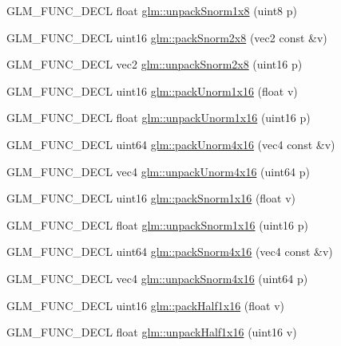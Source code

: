 \begin{DoxyCompactItemize}
\item 
G\+L\+M\+\_\+\+F\+U\+N\+C\+\_\+\+D\+E\+CL float \hyperlink{group__gtc__packing_ga6f2bebf536fbf7c8b97d4b306bb3354e}{glm\+::unpack\+Snorm1x8} (uint8 p)
\item 
G\+L\+M\+\_\+\+F\+U\+N\+C\+\_\+\+D\+E\+CL uint16 \hyperlink{group__gtc__packing_ga05d08a82923166ec7cd5d0e6154c9953}{glm\+::pack\+Snorm2x8} (vec2 const \&v)
\item 
G\+L\+M\+\_\+\+F\+U\+N\+C\+\_\+\+D\+E\+CL vec2 \hyperlink{group__gtc__packing_ga27f30f0281b88e152b0895f5e2ead878}{glm\+::unpack\+Snorm2x8} (uint16 p)
\item 
G\+L\+M\+\_\+\+F\+U\+N\+C\+\_\+\+D\+E\+CL uint16 \hyperlink{group__gtc__packing_ga60c7d915f5653559ae02c2f79a8c5c1d}{glm\+::pack\+Unorm1x16} (float v)
\item 
G\+L\+M\+\_\+\+F\+U\+N\+C\+\_\+\+D\+E\+CL float \hyperlink{group__gtc__packing_ga7770e3ade4f4764cc1b2eb42ac4ec188}{glm\+::unpack\+Unorm1x16} (uint16 p)
\item 
G\+L\+M\+\_\+\+F\+U\+N\+C\+\_\+\+D\+E\+CL uint64 \hyperlink{group__gtc__packing_gac561f06c908b7302537a8ef29fcb409e}{glm\+::pack\+Unorm4x16} (vec4 const \&v)
\item 
G\+L\+M\+\_\+\+F\+U\+N\+C\+\_\+\+D\+E\+CL vec4 \hyperlink{group__gtc__packing_gafb2b502bc406031a5618ce930139a9e3}{glm\+::unpack\+Unorm4x16} (uint64 p)
\item 
G\+L\+M\+\_\+\+F\+U\+N\+C\+\_\+\+D\+E\+CL uint16 \hyperlink{group__gtc__packing_gac29411d6c0f6ed0fe9f0396dfe92e0e8}{glm\+::pack\+Snorm1x16} (float v)
\item 
G\+L\+M\+\_\+\+F\+U\+N\+C\+\_\+\+D\+E\+CL float \hyperlink{group__gtc__packing_ga246f451cebf590726324f7a283e3d65e}{glm\+::unpack\+Snorm1x16} (uint16 p)
\item 
G\+L\+M\+\_\+\+F\+U\+N\+C\+\_\+\+D\+E\+CL uint64 \hyperlink{group__gtc__packing_ga9b237d7c66b7a71964e6d1f4dc06539f}{glm\+::pack\+Snorm4x16} (vec4 const \&v)
\item 
G\+L\+M\+\_\+\+F\+U\+N\+C\+\_\+\+D\+E\+CL vec4 \hyperlink{group__gtc__packing_ga1bfaa3f217fd7a4b6b9d3117ecb3fcac}{glm\+::unpack\+Snorm4x16} (uint64 p)
\item 
G\+L\+M\+\_\+\+F\+U\+N\+C\+\_\+\+D\+E\+CL uint16 \hyperlink{group__gtc__packing_gaba534b320836a35372e00af5771dd1a2}{glm\+::pack\+Half1x16} (float v)
\item 
G\+L\+M\+\_\+\+F\+U\+N\+C\+\_\+\+D\+E\+CL float \hyperlink{group__gtc__packing_gaa6eebcdfc746584b7d1823f1d5344fed}{glm\+::unpack\+Half1x16} (uint16 v)
\item 

\end{DoxyCompactItemize}
